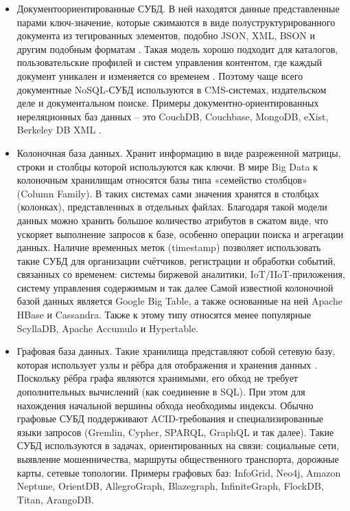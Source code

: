 \documentclass[14pt]{extreport}
\begin{document}
\begin{itemize}
	
	\item Документоориентированные СУБД. В ней находятся данные представленные парами ключ-значение, которые сжимаются в виде полуструктурированного документа из тегированных элементов, подобно JSON, XML, BSON и другим подобным форматам \cite{nosqlAws}. Такая модель хорошо подходит для каталогов, пользовательские профилей и систем управления контентом, где каждый документ уникален и изменяется со временем \cite{nosqlTp}.  Поэтому чаще всего документные NoSQL-СУБД используются в CMS-системах, издательском деле и документальном поиске. Примеры документно-ориентированных нереляционных баз данных -- это CouchDB, Couchbase, MongoDB, eXist, Berkeley DB XML  \cite{nosqlWiki}.
	\item Колоночная база данных. Хранит информацию в виде разреженной матрицы, строки и столбцы которой используются как ключи. В мире Big Data к колоночным хранилищам относятся базы типа «семейство столбцов» (Column Family). В таких системах сами значения хранятся в столбцах (колонках), представленных в отдельных файлах. Благодаря такой модели данных можно хранить большое количество атрибутов в сжатом виде, что ускоряет выполнение запросов к базе, особенно операции поиска и агрегации данных. Наличие временных меток (timestamp) позволяет использовать такие СУБД для организации счётчиков, регистрации и обработки событий, связанных со временем: системы биржевой аналитики, IoT/IIoT-приложения, систему управления содержимым и так далее Самой известной колоночной базой данных является Google Big Table, а также основанные на ней Apache HBase и Cassandra. Также к этому типу относятся менее популярные ScyllaDB, Apache Accumulo и Hypertable.
	\item Графовая база данных. Такие хранилища представляют собой сетевую базу, которая использует узлы и рёбра для отображения и хранения данных \cite{nosqlTp}. Поскольку рёбра графа являются хранимыми, его обход не требует дополнительных вычислений (как соединение в SQL). При этом для нахождения начальной вершины обхода необходимы индексы. Обычно графовые СУБД поддерживают ACID-требования и специализированные языки запросов (Gremlin, Cypher, SPARQL, GraphQL и так далее). Такие СУБД используются в задачах, ориентированных на связи: социальные сети, выявление мошенничества, маршруты общественного транспорта, дорожные карты, сетевые топологии. Примеры графовых баз: InfoGrid, Neo4j, Amazon Neptune, OrientDB, AllegroGraph, Blazegraph, InfiniteGraph, FlockDB, Titan, ArangoDB.	
\end{itemize}
\end{document}
